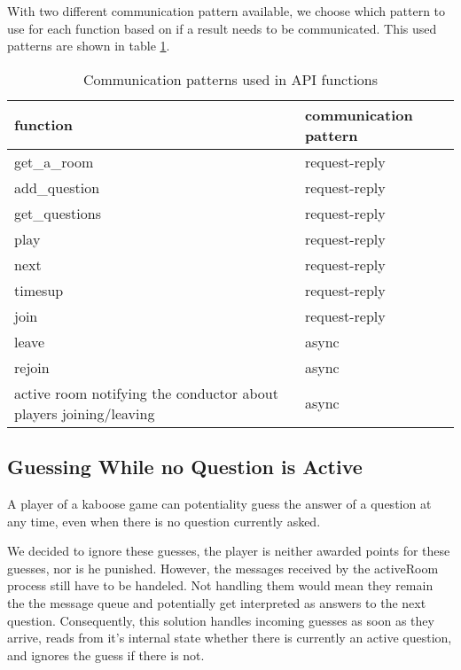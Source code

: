 \documentclass[11pt, a4paper]{article}
\begin{document}
With two different communication pattern available, we choose which pattern to use for each function based on if a result needs to be communicated. This used patterns are shown in table \ref{tab1}.

\begin{table}[h!]
	\centering
	\caption{Communication patterns used in API functions}
	\label{tab1}
	\begin{tabular}{l|l}
		function                                                          & communication pattern \\ \hline
		get\_a\_room                                                      & request-reply         \\
		add\_question                                                     & request-reply         \\
		get\_questions                                                    & request-reply         \\
		play                                                              & request-reply         \\
		next                                                              & request-reply         \\
		timesup                                                           & request-reply         \\
		join                                                              & request-reply         \\
		leave                                                             & async                 \\
		rejoin                                                            & async                 \\
		active room notifying the conductor about players joining/leaving & async                
	\end{tabular}
\end{table}


\subsection{Guessing While no Question is Active}
A player of a kaboose game can potentiality guess the answer of a question at any time, even when there is no question currently asked.

We decided to ignore these guesses, the player is neither awarded points for these guesses, nor is he punished.
However, the messages received by the activeRoom process still have to be handeled. Not handling them would mean they remain the the message queue and potentially get interpreted as answers to the next question. Consequently, this solution handles incoming guesses as soon as they arrive, reads from it's internal state whether there is currently an active question, and ignores the guess if there is not.
\end{document}
